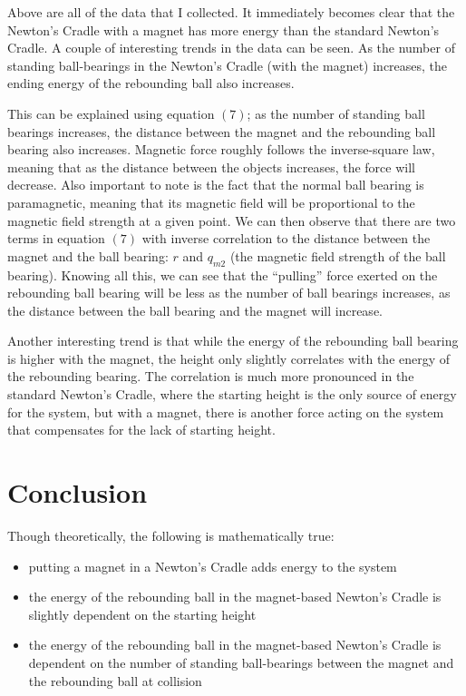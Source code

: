 \documentclass[aip,jmp,amsmath,amssymb,reprint,author-numerical]{revtex4-1}
\begin{document}
        Above are all of the data that I collected. It immediately becomes clear that the Newton's
        Cradle with a magnet has more energy than the standard Newton's Cradle.  A couple of
        interesting trends in the data can be seen. As the number of standing ball-bearings in the
        Newton's Cradle (with the magnet) increases, the ending energy of the rebounding ball also
        increases.

        This can be explained using equation $(7)$; as the number of standing ball bearings increases,
        the distance between the magnet and the rebounding ball bearing also increases. Magnetic force
        roughly follows the inverse-square law, meaning that as the distance between the objects
        increases, the force will decrease. Also important to note is the fact that the normal ball
        bearing is paramagnetic, meaning that its magnetic field will be proportional to the magnetic
        field strength at a given point. We can then observe that there are two terms in equation $(7)$
        with inverse correlation to the distance between the magnet and the ball bearing: $r$ and
        $q_{m2}$ (the magnetic field strength of the ball bearing). Knowing all this, we can see that
        the ``pulling'' force exerted on the rebounding ball bearing will be less as the number of
        ball bearings increases, as the distance between the ball bearing and the magnet will increase.

        Another interesting trend is that while the energy of the rebounding ball bearing is higher with
        the magnet, the height only slightly correlates with the energy of the rebounding bearing.
        The correlation is much more pronounced in the standard Newton's Cradle, where the starting
        height is the only source of energy for the system, but with a magnet, there is another force
        acting on the system that compensates for the lack of starting height.


    \section{\label{sec:concl}Conclusion}

        Though theoretically, the following is mathematically true:

        \begin{itemize}
            \item putting a magnet in a Newton's Cradle adds energy to the system
            \item the energy of the rebounding ball in the magnet-based Newton's Cradle is slightly
                dependent on the starting height
            \item the energy of the rebounding ball in the magnet-based Newton's Cradle is dependent
                on the number of standing ball-bearings between the magnet and the rebounding ball at
                collision
        \end{itemize}
\end{document}
